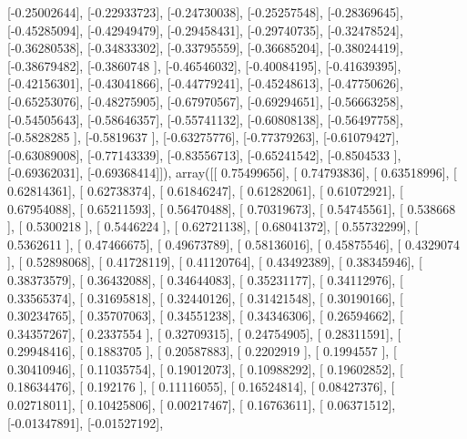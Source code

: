 \documentclass{article}
\begin{document}
       [-0.25002644],
       [-0.22933723],
       [-0.24730038],
       [-0.25257548],
       [-0.28369645],
       [-0.45285094],
       [-0.42949479],
       [-0.29458431],
       [-0.29740735],
       [-0.32478524],
       [-0.36280538],
       [-0.34833302],
       [-0.33795559],
       [-0.36685204],
       [-0.38024419],
       [-0.38679482],
       [-0.3860748 ],
       [-0.46546032],
       [-0.40084195],
       [-0.41639395],
       [-0.42156301],
       [-0.43041866],
       [-0.44779241],
       [-0.45248613],
       [-0.47750626],
       [-0.65253076],
       [-0.48275905],
       [-0.67970567],
       [-0.69294651],
       [-0.56663258],
       [-0.54505643],
       [-0.58646357],
       [-0.55741132],
       [-0.60808138],
       [-0.56497758],
       [-0.5828285 ],
       [-0.5819637 ],
       [-0.63275776],
       [-0.77379263],
       [-0.61079427],
       [-0.63089008],
       [-0.77143339],
       [-0.83556713],
       [-0.65241542],
       [-0.8504533 ],
       [-0.69362031],
       [-0.69368414]]), array([[ 0.75499656],
       [ 0.74793836],
       [ 0.63518996],
       [ 0.62814361],
       [ 0.62738374],
       [ 0.61846247],
       [ 0.61282061],
       [ 0.61072921],
       [ 0.67954088],
       [ 0.65211593],
       [ 0.56470488],
       [ 0.70319673],
       [ 0.54745561],
       [ 0.538668  ],
       [ 0.5300218 ],
       [ 0.5446224 ],
       [ 0.62721138],
       [ 0.68041372],
       [ 0.55732299],
       [ 0.5362611 ],
       [ 0.47466675],
       [ 0.49673789],
       [ 0.58136016],
       [ 0.45875546],
       [ 0.4329074 ],
       [ 0.52898068],
       [ 0.41728119],
       [ 0.41120764],
       [ 0.43492389],
       [ 0.38345946],
       [ 0.38373579],
       [ 0.36432088],
       [ 0.34644083],
       [ 0.35231177],
       [ 0.34112976],
       [ 0.33565374],
       [ 0.31695818],
       [ 0.32440126],
       [ 0.31421548],
       [ 0.30190166],
       [ 0.30234765],
       [ 0.35707063],
       [ 0.34551238],
       [ 0.34346306],
       [ 0.26594662],
       [ 0.34357267],
       [ 0.2337554 ],
       [ 0.32709315],
       [ 0.24754905],
       [ 0.28311591],
       [ 0.29948416],
       [ 0.1883705 ],
       [ 0.20587883],
       [ 0.2202919 ],
       [ 0.1994557 ],
       [ 0.30410946],
       [ 0.11035754],
       [ 0.19012073],
       [ 0.10988292],
       [ 0.19602852],
       [ 0.18634476],
       [ 0.192176  ],
       [ 0.11116055],
       [ 0.16524814],
       [ 0.08427376],
       [ 0.02718011],
       [ 0.10425806],
       [ 0.00217467],
       [ 0.16763611],
       [ 0.06371512],
       [-0.01347891],
       [-0.01527192],
\end{document}
